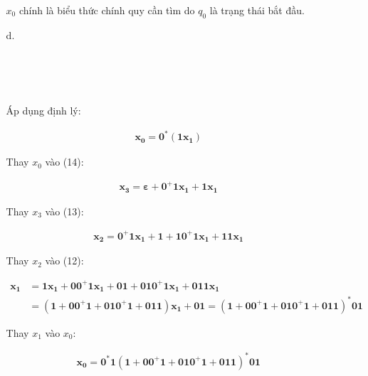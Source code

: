 \documentclass[12pt, a4paper]{article}
\begin{document}
\begin{itemize}
\begin{itemize}
				$x_0$ chính là biểu thức chính quy cần tìm do $q_0$ là trạng thái bắt đầu.
				
			\item[d.]
			
				\begin{numcases}{}
				\\
				\\
				\\
				\end{numcases}
				
				Áp dụng định lý:
				
				\begin{align*}
				\bm{ x_0 = 0^*(1x_1) }
				\end{align*}
				
				Thay $x_0$ vào (14):
				
				\begin{align*}
				\bm{ x_3 = \varepsilon + 0^+1x_1 + 1x_1 }
				\end{align*}
				
				Thay $x_3$ vào (13):
				
				\begin{align*}
				\bm{ x_2 = 0^+1x_1 + 1 + 10^+1x_1 + 11x_1 }
				\end{align*}
				
				Thay $x_2$ vào (12):
				
				\begin{align*}
				\bm{ x_1 } &= \bm{ 1x_1 + 00^+1x_1 + 01 + 010^+1x_1 + 011x_1 } \\
				&= \bm{ (1 + 00^+1 + 010^+1 + 011)x_1 + 01     = (1 + 00^+1 + 010^+1 + 011)^*01 }
				\end{align*}
				
				Thay $x_1$ vào $x_0$:
				
				\begin{align*}
				\bm{ x_0 = 0^*1 (1 + 00^+1 + 010^+1 + 011)^*01 }
				\end{align*}
		
		\end{itemize}
	
	\end{itemize}
	
\end{document}
